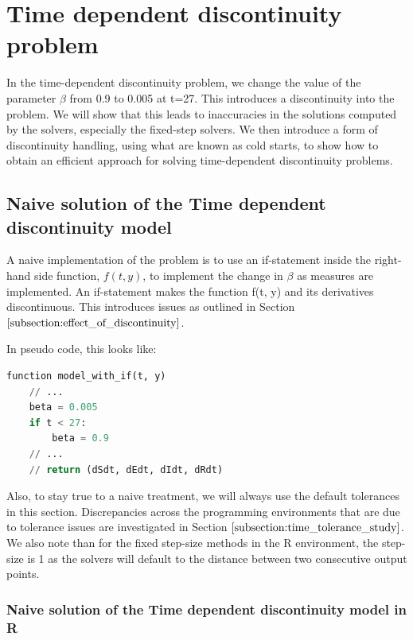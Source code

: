 \section{Time dependent discontinuity problem}
\label{section:time_problem}
In the time-dependent discontinuity problem, we change the value of the parameter $\beta$ from 0.9 to 0.005 at t=27. This introduces a discontinuity into the problem. We will show that this leads to inaccuracies in the solutions computed by the solvers, especially the fixed-step solvers. We then introduce a form of discontinuity handling, using what are known as cold starts, to show how to obtain an efficient approach for solving time-dependent discontinuity problems.

\subsection{Naive solution of the Time dependent discontinuity model}
\label{subsection:naive_time_problem}
A naive implementation of the problem is to use an if-statement inside the right-hand side function, $f(t, y)$, to implement the change in $\beta$ as measures are implemented. An if-statement makes the function f(t, y) and its derivatives discontinuous. This introduces issues as outlined in Section $\ref{subsection:effect_of_discontinuity}$.

In pseudo code, this looks like:

\begin{minipage}{\linewidth}
\begin{lstlisting}[language=Python]
function model_with_if(t, y)
    // ...
    beta = 0.005
    if t < 27:
        beta = 0.9
    // ...
    // return (dSdt, dEdt, dIdt, dRdt)
\end{lstlisting}
\end{minipage}

Also, to stay true to a naive treatment, we will always use the default tolerances in this section. Discrepancies across the programming environments that are due to tolerance issues are investigated in Section $\ref{subsection:time_tolerance_study}$. We also note than for the fixed step-size methods in the R environment, the step-size is 1 as the solvers will default to the distance between two consecutive output points.
\subsubsection{Naive solution of the Time dependent discontinuity model in R}

